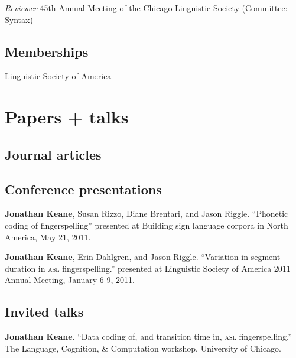 \documentclass[10pt, letterpaper]{article}
\newcommand{\years}[1]{\marginpar{\scriptsize #1}}
\begin{document}
\-\years{2009}\textit{Reviewer} 45th Annual Meeting of the Chicago Linguistic Society (Committee: Syntax)

\subsection*{Memberships}
\label{sec:memberships}
\-\years{2008--}Linguistic Society of America


\section*{Papers + talks}
\setlength\parskip{1ex}

\subsection*{Journal articles}
\begin{hangparas}{1em}{1}

\end{hangparas}

\subsection*{Conference presentations}
\begin{hangparas}{1em}{1}
\-\years{2011} \textbf{Jonathan Keane}, Susan Rizzo, Diane Brentari, and Jason Riggle. “Phonetic coding of fingerspelling” presented at Building sign language corpora in North America, May 21, 2011. 

  \-\years{2011} \textbf{Jonathan Keane}, Erin Dahlgren, and Jason Riggle. “Variation in segment duration in \textsc{asl} fingerspelling.” presented at Linguistic Society of America 2011 Annual Meeting, January 6-9, 2011. 
\end{hangparas}

\vspace{2ex}
\subsection*{Invited talks}
\begin{hangparas}{1em}{1}
  \-\years{2011} \textbf{Jonathan Keane}. “Data coding of, and transition time in, \textsc{asl} fingerspelling.” The Language, Cognition, \& Computation workshop, University of Chicago. 
\end{hangparas}
\end{document}
